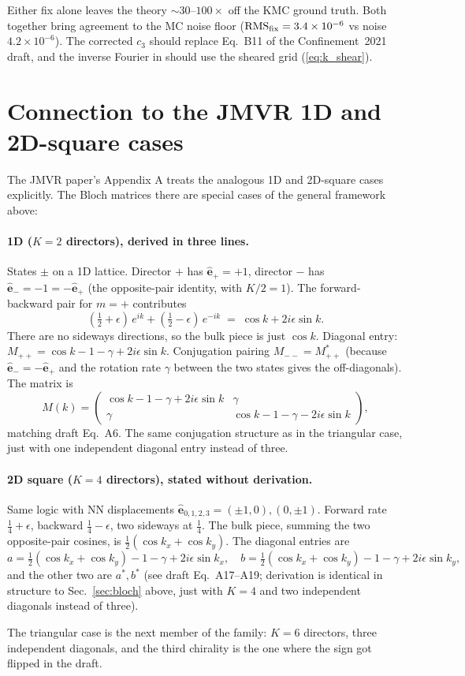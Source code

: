 \documentclass[11pt,a4paper]{article}
\newcommand{\veps}[1]{\hat{\mathbf{e}}_{#1}}
\begin{document}
\noindent Either fix alone leaves the theory $\sim 30$--$100\times$ off
the KMC ground truth. Both together bring agreement to the MC noise
floor ($\text{RMS}_{\rm fix} = 3.4 \times 10^{-6}$ vs noise
$4.2 \times 10^{-6}$). The corrected $c_3$ should replace Eq.~B11 of the
Confinement~2021 draft, and the inverse Fourier in {}
should use the sheared grid (\ref{eq:k_shear}).

\appendix
\section{Connection to the JMVR 1D and 2D-square cases}\label{app:jmvr-other}

The JMVR paper's Appendix A treats the analogous 1D and 2D-square cases
explicitly. The Bloch matrices there are special cases of the general
framework above:

\paragraph{1D ($K = 2$ directors), derived in three lines.} States
$\pm$ on a 1D lattice. Director $+$ has $\veps{+} = +1$, director $-$
has $\veps{-} = -1 = -\veps{+}$ (the opposite-pair identity, with
$K/2 = 1$). The forward-backward pair for $m = +$ contributes
\[
(\tfrac{1}{2}+\epsilon)\,e^{ik} + (\tfrac{1}{2}-\epsilon)\,e^{-ik}
\;=\; \cos k + 2 i \epsilon \sin k.
\]
There are no sideways directions, so the bulk piece is just $\cos k$.
Diagonal entry: $M_{++} = \cos k - 1 - \gamma + 2 i \epsilon \sin k$.
Conjugation pairing $M_{--} = M_{++}^{*}$ (because
$\veps{-} = -\veps{+}$ and the rotation rate $\gamma$ between the two
states gives the off-diagonals). The matrix is
\[
M(k) = \begin{pmatrix} \cos k - 1 - \gamma + 2 i \epsilon \sin k & \gamma \\
\gamma & \cos k - 1 - \gamma - 2 i \epsilon \sin k \end{pmatrix},
\]
matching draft Eq.~A6. The same conjugation structure as in the
triangular case, just with one independent diagonal entry instead of
three.

\paragraph{2D square ($K = 4$ directors), stated without derivation.}
Same logic with NN displacements $\veps{0,1,2,3} = (\pm 1, 0), (0, \pm 1)$.
Forward rate $\tfrac{1}{4} + \epsilon$, backward $\tfrac{1}{4} - \epsilon$,
two sideways at $\tfrac{1}{4}$. The bulk piece, summing the two
opposite-pair cosines, is $\tfrac{1}{2}(\cos k_x + \cos k_y)$. The
diagonal entries are
\[
a = \tfrac{1}{2}(\cos k_x + \cos k_y) - 1 - \gamma + 2 i \epsilon \sin k_x,\quad
b = \tfrac{1}{2}(\cos k_x + \cos k_y) - 1 - \gamma + 2 i \epsilon \sin k_y,
\]
and the other two are $a^*, b^*$ (see draft Eq.~A17--A19; derivation is
identical in structure to Sec.~\ref{sec:bloch} above, just with
$K = 4$ and two independent diagonals instead of three).

The triangular case is the next member of the family: $K = 6$ directors,
three independent diagonals, and the third chirality is the one where
the sign got flipped in the draft.
\end{document}

